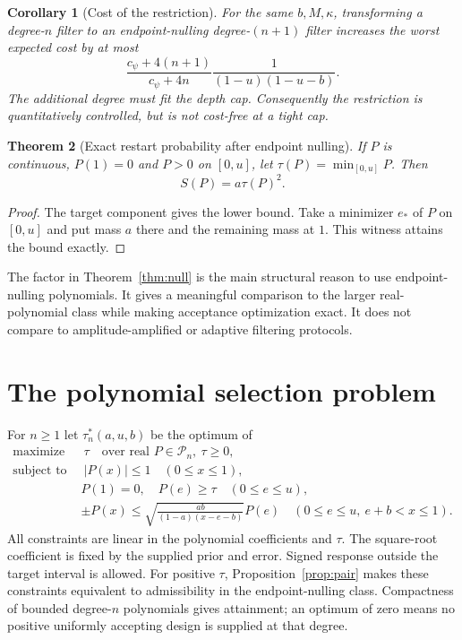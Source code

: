 \documentclass[11pt]{article}
\newtheorem{theorem}{Theorem}
\newtheorem{corollary}[theorem]{Corollary}
\newcommand{\cP}{\mathcal P}
\begin{document}
\begin{corollary}[Cost of the restriction]\label{cor:restriction}
For the same $b,M,\kappa$, transforming a degree-$n$ filter to an
endpoint-nulling degree-$(n+1)$ filter increases the worst expected cost
by at most
\begin{equation}\label{eq:restriction-cost}
 \frac{c_\psi+4(n+1)}{c_\psi+4n}
 \frac{1}{(1-u)(1-u-b)}.
\end{equation}
The additional degree must fit the depth cap. Consequently the restriction
is quantitatively controlled, but is not cost-free at a tight cap.
\end{corollary}

\begin{theorem}[Exact restart probability after endpoint nulling]\label{thm:success}
If $P$ is continuous, $P(1)=0$ and $P>0$ on $[0,u]$, let
$\tau(P)=\min_{[0,u]}P$. Then
\begin{equation}\label{eq:success}
 S(P)=a\tau(P)^2.
\end{equation}
\end{theorem}
\begin{proof}
The target component gives the lower bound. Take a minimizer $e_*$ of
$P$ on $[0,u]$ and put mass $a$ there and the remaining mass at $1$.
This witness attains the bound exactly.
\end{proof}

The factor in Theorem~\ref{thm:null} is the main structural reason to use
endpoint-nulling polynomials. It gives a meaningful comparison to the
larger real-polynomial class while making acceptance optimization exact.
It does not compare to amplitude-amplified or adaptive filtering protocols.

\section{The polynomial selection problem}\label{sec:design}
For $n\geq1$ let $\tau_n^*(a,u,b)$ be the optimum of
\begin{align}\label{eq:lp}
 \text{maximize }&\ \tau\quad\text{over real }P\in\cP_n,\ \tau\geq0,\nonumber\\
 \text{subject to }&\ |P(x)|\leq1\quad(0\leq x\leq1),\nonumber\\
 &P(1)=0,\quad P(e)\geq\tau\quad(0\leq e\leq u),\\
 &\pm P(x)\leq
   \sqrt{\frac{ab}{(1-a)(x-e-b)}}P(e)
   \quad(0\leq e\leq u,\ e+b<x\leq1).\nonumber
\end{align}
All constraints are linear in the polynomial coefficients and $\tau$.
The square-root coefficient is fixed by the supplied prior and error.
Signed response outside the target interval is allowed.
For positive $\tau$, Proposition~\ref{prop:pair} makes these constraints
equivalent to admissibility in the endpoint-nulling class. Compactness of
bounded degree-$n$ polynomials gives attainment; an optimum of zero means
no positive uniformly accepting design is supplied at that degree.
\end{document}
